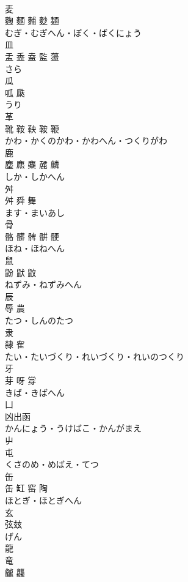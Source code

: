 \documentclass[8pt]{extreport}
\begin{document}
\begin{CJK}{UTF8}{min}
\\	麦 
\\	麴 麵 麱 麨 麺	
\\	むぎ・むぎへん・ぼく・ばくにょう	
\\	皿	
\\	盂 盉 盍 監 蘯	
\\	さら	
\\	瓜	
\\	呱 瓞	
\\	うり	
\\	革	
\\	靴 鞍 鞅 鞍 鞭	
\\	かわ・かくのかわ・かわへん・つくりがわ	
\\	鹿	
\\	塵 麃 麋 麉 麟	
\\	しか・しかへん	
\\	舛	
\\	舛 舜 舞	
\\	ます・まいあし	
\\	骨	
\\	骼 髒 髀 骿 骾	
\\	ほね・ほねへん	
\\	鼠	
\\	鼢 鼣 鼤	
\\	ねずみ・ねずみへん	
\\	辰	
\\	辱 農	
\\	たつ・しんのたつ	
\\	隶	
\\	隸 隺	
\\	たい・たいづくり・れいづくり・れいのつくり	
\\	牙	
\\	芽 呀 牚	
\\	きば・きばへん	
\\	凵	
\\	凶出函	
\\	かんにょう・うけばこ・かんがまえ	
\\	屮	
\\	屯	
\\	くさのめ・めばえ・てつ	
\\	缶	
\\	缶 缸 窑 陶	
\\	ほとぎ・ほとぎへん	
\\	玄	
\\	弦玆	
\\	げん	
\\	龍	
\\	竜 
\\	龖 龘	

\end{CJK}
\end{document}
